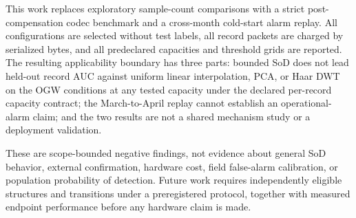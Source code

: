 This work replaces exploratory sample-count comparisons with a strict
post-compensation codec benchmark and a cross-month cold-start alarm replay.
All configurations are selected without test labels, all record packets are
charged by serialized bytes, and all predeclared capacities and threshold
grids are reported. The resulting applicability boundary has three parts:
bounded SoD does not lead held-out record AUC against uniform linear
interpolation, PCA, or Haar DWT on the OGW conditions at any tested capacity
under the declared per-record capacity contract; the March-to-April replay
cannot establish an operational-alarm claim; and the two results are not a
shared mechanism study or a deployment validation.

These are scope-bounded negative findings, not evidence about general SoD
behavior, external confirmation, hardware cost, field false-alarm calibration,
or population probability of detection. Future work requires independently
eligible structures and transitions under a preregistered protocol, together
with measured endpoint performance before any hardware claim is made.
